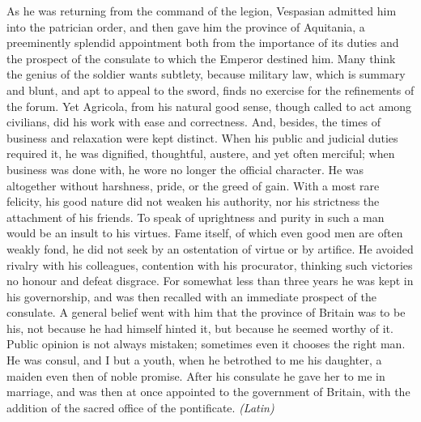 As he was returning from the command of the legion, Vespasian admitted him into the patrician order, and then gave him the province of Aquitania, a preeminently splendid appointment both from the importance of its duties and the prospect of the consulate to which the Emperor destined him. Many think the genius of the soldier wants subtlety, because military law, which is summary and blunt, and apt to appeal to the sword, finds no exercise for the refinements of the forum. Yet Agricola, from his natural good sense, though called to act among civilians, did his work with ease and correctness. And, besides, the times of business and relaxation were kept distinct. When his public and judicial duties required it, he was dignified, thoughtful, austere, and yet often merciful; when business was done with, he wore no longer the official character. He was altogether without harshness, pride, or the greed of gain. With a most rare felicity, his good nature did not weaken his authority, nor his strictness the attachment of his friends. To speak of uprightness and purity in such a man would be an insult to his virtues. Fame itself, of which even good men are often weakly fond, he did not seek by an ostentation of virtue or by artifice. He avoided rivalry with his colleagues, contention with his procurator, thinking such victories no honour and defeat disgrace. For somewhat less than three years he was kept in his governorship, and was then recalled with an immediate prospect of the consulate. A general belief went with him that the province of Britain was to be his, not because he had himself hinted it, but because he seemed worthy of it. Public opinion is not always mistaken; sometimes even it chooses the right man. He was consul, and I but a youth, when he betrothed to me his daughter, a maiden even then of noble promise. After his consulate he gave her to me in marriage, and was then at once appointed to the government of Britain, with the addition of the sacred office of the pontificate. \emph{(Latin)}


